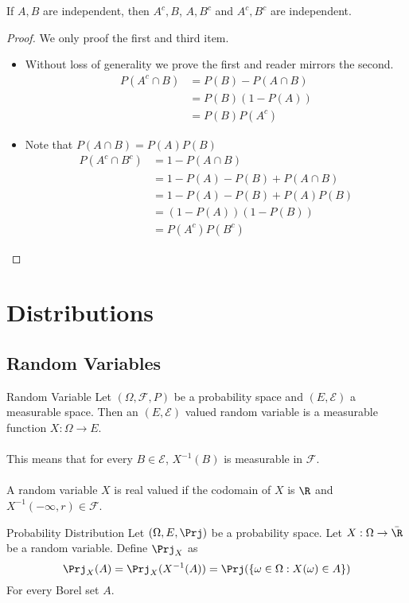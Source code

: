 \documentclass[a4paper]{article}
\begin{document}
\begin{prp}{}{} If $A,B$ are independent, then $A^c,B$, $A,B^c$ and $A^c,B^c$ are independent. 
\end{prp}
\begin{proof} We only proof the first and third item. 
\begin{itemize}
\item Without loss of generality we prove the first and reader mirrors the second. 
\begin{align*}
P(A^c\cap B)&=P(B)-P(A\cap B)\\
&=P(B)(1-P(A))\\
&=P(B)P(A^c)
\end{align*}
\item Note that $P(A\cap B)=P(A)P(B)$
\begin{align*}
P(A^c\cap B^c)&=1-P(A\cap B)\\
&=1-P(A)-P(B)+P(A\cap B)\\
&=1-P(A)-P(B)+P(A)P(B)\\
&=(1-P(A))(1-P(B))\\
&=P(A^c)P(B^c)
\end{align*}
\end{itemize}
\end{proof}

\pagebreak
\section{Distributions}
\subsection{Random Variables}
\begin{defn}{Random Variable}{} Let $(\Omega,\mathcal{F},P)$ be a probability space and $(E,\mathcal{E})$ a measurable space. Then an $(E,\mathcal{E})$ valued random variable is a measurable function $X:\Omega\to E$. \\~\\
This means that for every $B\in\mathcal{E}$, $X^{-1}(B)$ is measurable in $\mathcal{F}$. \\~\\
A random variable $X$ is real valued if the codomain of $X$ is $\R$ and $X^{-1}(-\infty,r)\in\mathcal{F}$. 
\end{defn}

\begin{defn}{Probability Distribution}{} Let $(\Omega,E,\Prj)$ be a probability space. Let $X:\Omega\to\bar\R$ be a random variable. Define $\Prj_X$ as $$\Prj_X(A)=\Prj_X(X^{-1}(A))=\Prj(\{\omega\in\Omega:X(\omega)\in A\})$$ For every Borel set $A$. 
\end{defn}
\end{document}
